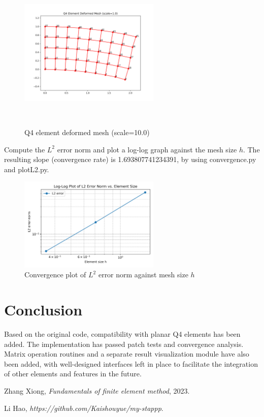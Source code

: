 \documentclass[a4paper,12pt]{report}
\begin{document}
\begin{figure}[htbp]
    \centering
    \includegraphics[width=0.6\textwidth]{test4_8_deformed.png}
    \caption{Q4 element deformed mesh (scale=10.0)}
    \label{fig:patch4_8_deform}\
\end{figure}

Compute the $L^2$ error norm and plot a log-log graph against the mesh size $h$. The resulting slope (convergence rate) is 1.693807741234391,
by using convergence.py and plotL2.py.

\begin{figure}[htbp]
    \centering
    \includegraphics[width=0.6\textwidth]{plotL2.png}
    \caption{Convergence plot of $L^2$ error norm against mesh size $h$}
    \label{fig:convergence_plot}
\end{figure}

\chapter{Conclusion}
Based on the original code, compatibility with planar Q4 elements has been added. The implementation has passed patch tests and convergence analysis. Matrix operation routines and a separate result visualization module have also been added, with well-designed interfaces left in place to facilitate the integration of other elements and features in the future.


\appendix

\clearpage  %


\begin{thebibliography}{1}

Zhang Xiong, 
\textit{Fundamentals of finite element method},  2023.

Li Hao, 
\textit{https://github.com/Kaishouyue/my-stappp}.


\end{thebibliography}
\end{document}
